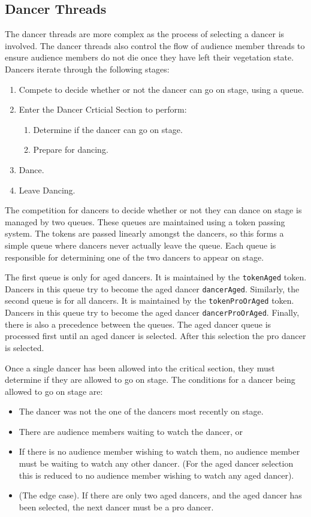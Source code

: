 \documentclass[12pt,a4paper]{scrartcl}
\begin{document}
\subsection{Dancer Threads}
The dancer threads are more complex as the process of selecting a dancer is involved.
The dancer threads also control the flow of audience member threads to ensure audience members do not die once they have left their vegetation state.
Dancers iterate through the following stages:
\begin{enumerate}
    \item Compete to decide whether or not the dancer can go on stage, using a queue.
    \item Enter the Dancer Crticial Section to perform:
    \begin{enumerate}
        \item Determine if the dancer can go on stage.
        \item Prepare for dancing.
    \end{enumerate}
    \item Dance.
    \item Leave Dancing.
\end{enumerate}

The competition for dancers to decide whether or not they can dance on stage is managed by two queues.
These queues are maintained using a token passing system.
The tokens are passed linearly amongst the dancers, so this forms a simple queue where dancers never actually leave the queue.
Each queue is responsible for determining one of the two dancers to appear on stage.

The first queue is only for aged dancers.
It is maintained by the \texttt{tokenAged} token.
Dancers in this queue try to become the aged dancer \texttt{dancerAged}.
Similarly, the second queue is for all dancers.
It is maintained by the \texttt{tokenProOrAged} token.
Dancers in this queue try to become the aged dancer \texttt{dancerProOrAged}.
Finally, there is also a precedence between the queues.
The aged dancer queue is processed first until an aged dancer is selected.
After this selection the pro dancer is selected.

Once a single dancer has been allowed into the critical section, they must determine if they are allowed to go on stage.
The conditions for a dancer being allowed to go on stage are:
\begin{itemize}
    \item The dancer was not the one of the dancers most recently on stage.
    \item There are audience members waiting to watch the dancer, or
    \item If there is no audience member wishing to watch them, no audience member must be waiting to watch any other dancer.
          (For the aged dancer selection this is reduced to no audience member wishing to watch any aged dancer).
    \item (The edge case). If there are only two aged dancers, and the aged dancer has been selected, the next dancer must be a pro dancer.
\end{itemize}
\end{document}
